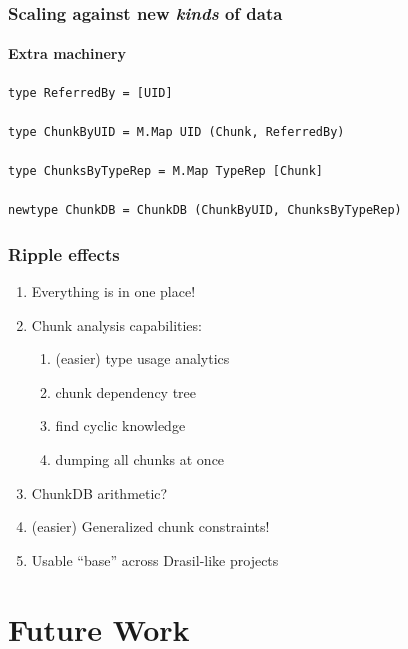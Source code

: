 \documentclass[xcolor={dvipsnames}]{beamer}
\begin{document}
\begin{frame}[fragile]
  \frametitle{Scaling against new \textit{kinds} of data}
  \framesubtitle{Extra machinery}

\begin{verbatim}
type ReferredBy = [UID]

type ChunkByUID = M.Map UID (Chunk, ReferredBy)

type ChunksByTypeRep = M.Map TypeRep [Chunk]

newtype ChunkDB = ChunkDB (ChunkByUID, ChunksByTypeRep)
\end{verbatim}
\end{frame}

\begin{frame}
  \frametitle{Ripple effects}

  \begin{enumerate}
    \item Everything is in one place!
    \item Chunk analysis capabilities:
      \begin{enumerate}
        \item (easier) type usage analytics
        \item chunk dependency tree
        \item find cyclic knowledge
        \item dumping all chunks at once
      \end{enumerate}
    \item ChunkDB arithmetic?
    \item (easier) Generalized chunk constraints!
    \item Usable ``base'' across Drasil-like projects
  \end{enumerate}
\end{frame}

\section{Future Work}
\end{document}
